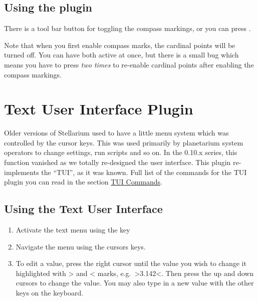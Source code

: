 \subsection{Using the plugin}
\label{sec:plugins:CompassMarks:using}

There is a tool bar button for toggling the compass markings, or you can
press .

Note that when you first enable compass marks, the cardinal points will
be turned off. You can have both active at once, but there is a small
bug which means you have to press  \emph{two times} to
re-enable cardinal points after enabling the compass markings.

\section{Text User Interface Plugin}
\label{sec:plugins:TUI}


Older versions of Stellarium used to have a little menu system which was
controlled by the cursor keys. This was used primarily by planetarium
system operators to change settings, run scripts and so on. In the
0.10.x series, this function vanished as we totally re-designed the user
interface. This plugin re-implements the ``TUI'', as it was known. Full
list of the commands for the TUI plugin you can read in the section
\href{TUI_Commands}{TUI Commands}.

\subsection{Using the Text User Interface}
\label{sec:plugins:TUI:using}

\begin{enumerate}
\item
  Activate the text menu using the  key
\item
  Navigate the menu using the cursors keys.
\item
  To edit a value, press the right cursor until the value you wish to
  change it highlighted with \textgreater{} and \textless{} marks, e.g.\
  \textgreater{}3.142\textless{}. Then press the up and down cursors to
  change the value. You may also type in a new value with the other keys
  on the keyboard.
\end{enumerate}

